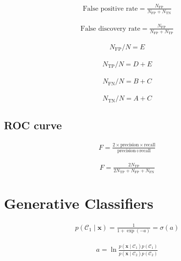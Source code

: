 \documentclass{article}
\begin{document}
\begin{align*}
\text{False positive rate} = \frac{N_{\mathrm{FP}}}{N_{\mathrm{FP}} + N_{\mathrm{TN}}}
\tag{5.32}
\end{align*}

\begin{align*}
\text{False discovery rate} = \frac{N_{\mathrm{FP}}}{N_{\mathrm{FP}} + N_{\mathrm{TP}}}
\tag{5.33}
\end{align*}

\begin{align*}
N_{\mathrm{FP}} / N = E
\tag{5.34}
\end{align*}

\begin{align*}
N_{\mathrm{TP}} / N = D + E
\tag{5.35}
\end{align*}

\begin{align*}
N_{\mathrm{FN}} / N = B + C
\tag{5.36}
\end{align*}

\begin{align*}
N_{\mathrm{TN}} / N = A + C
\tag{5.37}
\end{align*}

\subsection{ROC curve}

\begin{align*}
F = \frac{2 \times \text{precision} \times \text{recall}}{\text{precision} + \text{recall}}
\tag{5.38}
\end{align*}

\begin{align*}
F = \frac{2 N_{\mathrm{TP}}}{2 N_{\mathrm{TP}} + N_{\mathrm{FP}} + N_{\mathrm{FN}}}
\tag{5.39}
\end{align*}

\section{Generative Classifiers}

\begin{align*}
p\left(\mathcal{C}_{1} \mid \mathbf{x}\right) = \frac{1}{1 + \exp(-a)} = \sigma(a)
\tag{5.40}
\end{align*}

\begin{align*}
a = \ln \frac{p\left(\mathbf{x} \mid \mathcal{C}_{1}\right) p\left(\mathcal{C}_{1}\right)}{p\left(\mathbf{x} \mid \mathcal{C}_{2}\right) p\left(\mathcal{C}_{2}\right)}
\tag{5.41}
\end{align*}
\end{document}
